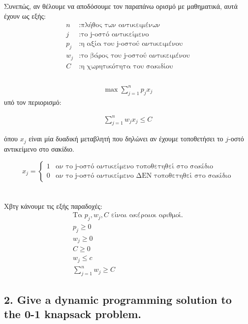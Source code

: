 \documentclass[12pt]{article}
\begin{document}
Συνεπώς, αν θέλουμε να αποδόσουμε τον παραπάνω ορισμό με μαθηματικά, αυτά έχουν ως εξής: \\

\begin{align*}
	n &: \text{πλήθος των αντικειμένων}  \\
	j  &: \text{το j-οστό αντικείμενο}  \\
 	p_{j} &: \text{η αξία του j-οστού αντικειμένου}  \\
 	w_{j} &: \text{το βάρος του j-οστού αντικειμένου}  \\
 	C &: \text{η χωρητικότητα του σακιδίου} \\
\end{align*} \\

\begin{align*}
	\max \sum_{j=1}^{n}{p_{j}x_{j}}
\end{align*}
υπό τον περιορισμό:

\begin{align*}
	\sum_{j=1}^{n}{w_{j}x_{j}} \leq C
\end{align*}

όπου \(x_{j}\) είναι μία δυαδική μεταβλητή που δηλώνει αν έχουμε τοποθετήσει το \(j\)-οστό αντικείμενο στο σακίδιο.

 \[ x_{j} =
 \begin{cases}
 	1 & \text{αν το j-οστό αντικείμενο τοποθετηθεί στο σακίδιο} \\
 	0 & \text{αν το j-οστό αντικείμενο ΔΕΝ τοποθετηθεί στο σακίδιο}
 \end{cases}
 \]
\\ \\
Χβτγ κάνουμε τις εξής παραδοχές: \\
\begin{align*}
	\text{Τα } p_{j}, w_{j}, C \text{ είναι ακέραιοι αριθμοί.} \\
	 p_{j} \geq 0 \\
	 w_{j} \geq 0 \\
	 C \geq 0 \\
	 w_{j} \leq c \\
	 \sum_{j=1}^{n} w_{j} \geq C
\end{align*}

\vspace{2in}

\pagebreak

\subsection*{2. Give a dynamic programming solution to the 0-1 knapsack problem.}
\end{document}
